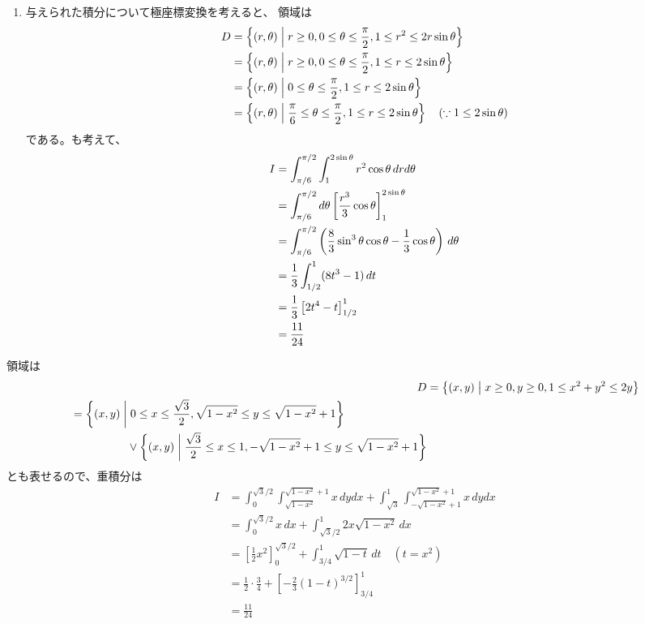 \begin{ans*}
\begin{enumerate}[label=(\arabic*)]
    \item
    与えられた積分について極座標変換を考えると、
    領域は
    \begin{align}
      D &= \left\{ (r,{\theta})\mathrel{}\middle| \mathrel{} r\geq 0, 0\leq{\theta}\leq\frac{\pi}{2}, 1\leq r^2 \leq 2r\sin{\theta} \right\}\\
        &= \left\{ (r,{\theta})\mathrel{}\middle| \mathrel{} r\geq 0, 0\leq{\theta}\leq\frac{\pi}{2}, 1\leq r \leq 2\sin{\theta} \right\}\\
        &= \left\{ (r,{\theta})\mathrel{}\middle| \mathrel{} 0\leq{\theta}\leq\frac{\pi}{2}, 1\leq r \leq 2\sin{\theta} \right\}\\
        &= \left\{ (r,{\theta})\mathrel{}\middle| \mathrel{} \frac{\pi}{6}\leq{\theta}\leq\frac{\pi}{2}, 1\leq r \leq 2\sin{\theta} \right\}\quad(\because 1\leq 2\sin{\theta})
    \end{align}
    である。も考えて、
    \begin{align}
      I
      &= \int_{\pi/6}^{\pi/2}\int_{1}^{2\sin{\theta}} r^2\cos{\theta} \,drd{\theta}  \\
      &= \int_{\pi/6}^{\pi/2}d{\theta} \left[ \frac{r^3}{3}\cos{\theta} \right]_{1}^{2\sin{\theta}} \\
      &= \int_{\pi/6}^{\pi/2}\left( \frac{8}{3}\sin^3{\theta}\cos{\theta} - \frac{1}{3}\cos{\theta} \right) \,d{\theta} \\
      &= \frac{1}{3}\int_{1/2}^{1}(8t^3-1) \,dt \\
      &= \frac{1}{3}\left[ 2t^4 - t \right]_{1/2}^{1} \\
      &= \frac{11}{24}
    \end{align}
  \end{enumerate}
\end{ans*}
\begin{other*}
  領域は
  \begin{align}
    D
    &= \left\{(x,y)\mathrel{}\middle| \mathrel{} x\geq 0, y\geq 0, 1\leq x^2 + y^2\leq 2y\right\} \\
    \begin{split}
      &= \left\{(x,y)\mathrel{}\middle| \mathrel{} 0\leq x\leq \frac{\sqrt{3}}{2}, \sqrt{1-x^2}\leq y\leq \sqrt{1-x^2}+1 \right\} \\
      &\hspace*{50pt} \vee \left\{(x,y)\mathrel{}\middle| \mathrel{} \frac{\sqrt{3}}{2}\leq x\leq 1, -\sqrt{1-x^2}+1\leq y\leq \sqrt{1-x^2}+1 \right\}
    \end{split}
  \end{align}
  とも表せるので、重積分は
  \begin{align}
    I
    &= \int_{0}^{\sqrt{3}/2}\int_{\sqrt{1-x^2}}^{\sqrt{1-x^2}+1} x\,dydx
       + \int_{\sqrt{3}}^{1}\int_{-\sqrt{1-x^2}+1}^{\sqrt{1-x^2}+1}x\,dydx \\
    &= \int_{0}^{\sqrt{3}/2} x \,dx + \int_{\sqrt{3}/2}^{1}2x\sqrt{1-x^2}\,dx \\
    &= \left[\frac{1}{2}x^2\right]_{0}^{\sqrt{3}/2} + \int_{3/4}^{1}\sqrt{1-t}\,dt \quad(t=x^2) \\
    &= \frac{1}{2}\cdot\frac{3}{4} + \left[-\frac{2}{3}(1-t)^{3/2}\right]_{3/4}^{1} \\
    &= \frac{11}{24}
  \end{align}
\end{other*}


